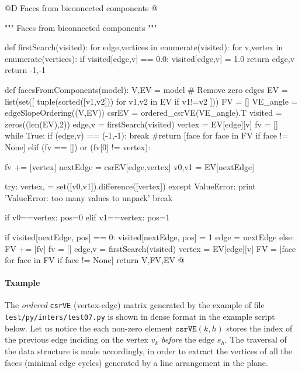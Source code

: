 \documentclass[11pt,oneside]{article}    %
\begin{document}
@D Faces from biconnected components
@{""" Faces from biconnected components """

def firstSearch(visited):
    for edge,vertices in enumerate(visited):
        for v,vertex in enumerate(vertices):
            if visited[edge,v] == 0.0:
                visited[edge,v] = 1.0
                return edge,v
    return -1,-1

def facesFromComponents(model):
    V,EV = model
    # Remove zero edges
    EV = list(set([ tuple(sorted([v1,v2])) for v1,v2 in EV if v1!=v2 ]))
    FV = []
    VE_angle = edgeSlopeOrdering((V,EV))
    csrEV = ordered_csrVE(VE_angle).T
    visited = zeros((len(EV),2))
    edge,v = firstSearch(visited)
    vertex = EV[edge][v]
    fv = []
    while True:
        if (edge,v) == (-1,-1):
            break #return [face for face in FV if face != None]
        elif (fv == []) or (fv[0] != vertex):
            
            fv += [vertex]
            nextEdge = csrEV[edge,vertex]
            v0,v1 = EV[nextEdge]
            
            try:
                vertex, = set([v0,v1]).difference([vertex])
            except ValueError:
                print 'ValueError: too many values to unpack'
                break
                
            if v0==vertex: pos=0
            elif v1==vertex: pos=1
                        
            if visited[nextEdge, pos] == 0:
                visited[nextEdge, pos] = 1
                edge = nextEdge                
        else:
            FV += [fv]
            fv = []
            edge,v = firstSearch(visited)
            vertex = EV[edge][v]
        FV = [face for face in FV if face != None]
    return V,FV,EV
@}

\paragraph{Txample}
The \emph{ordered} \texttt{csrVE} (vertex-edge) matrix generated by the example of file \texttt{test/py/inters/test07.py} is shown in dense format in the example script below.
Let us notice the each non-zero element $\texttt{csrVE}(k,h)$ stores the index of the previous edge 
inciding on the vertex $v_k$ \emph{before} the edge $e_h$. The traversal of the data structure is made accordingly, in order to extract the vertices of all the faces (minimal edge cycles) generated by a line arrangement in the plane.
\end{document}
